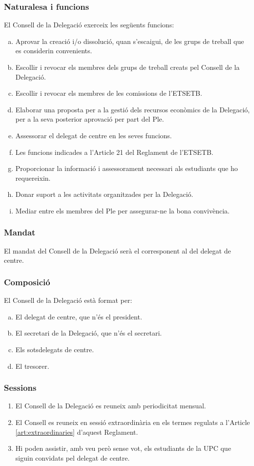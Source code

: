 \documentclass[a4paper,12pt]{article}
\renewcommand*{\thesubsubsection}{\arabic{subsubsection}}
\begin{document}
\subsubsection{Naturalesa i funcions}
El Consell de la Delegació exerceix les següents funcions:
\begin{enumerate}[a)]
	\item Aprovar la creació i/o dissolució, quan s'escaigui, de les grups de treball que es considerin convenients.
	\item Escollir i revocar els membres dels grups de treball creats pel Consell de la Delegació.
	\item Escollir i revocar els membres de les comissions de l'ETSETB.
	\item Elaborar una proposta per a la gestió dels recursos econòmics de la Delegació, per a la seva posterior aprovació per part del Ple.
	\item Assessorar el delegat de centre en les seves funcions.
	\item Les funcions indicades a l'Article 21 del Reglament de l'ETSETB.
	\item Proporcionar la informació i assessorament necessari als estudiants que ho requereixin.
	\item Donar suport a les activitats organitzades per la Delegació.
	\item Mediar entre els membres del Ple per assegurar-ne la bona convivència.
\end{enumerate}

\subsubsection{Mandat}
El mandat del Consell de la Delegació serà el corresponent al del delegat de centre.

\subsubsection{Composició}
El Consell de la Delegació està format per:
\begin{enumerate}[a)]
	\item El delegat de centre, que n'és el president.
	\item El secretari de la Delegació, que n'és el secretari.
	\item Els sotsdelegats de centre.
	\item El tresorer.
\end{enumerate}

\subsubsection{Sessions}
\begin{enumerate}[\thesubsubsection.1]
	\item El Consell de la Delegació es reuneix amb periodicitat mensual.
	\item El Consell es reuneix en sessió extraordinària en els termes regulats a l'Article \ref{art:extraordinaries} d'aquest Reglament.
	\item Hi poden assistir, amb veu però sense vot, els estudiants de la UPC que siguin convidats pel delegat de centre.
\end{enumerate}
\end{document}
